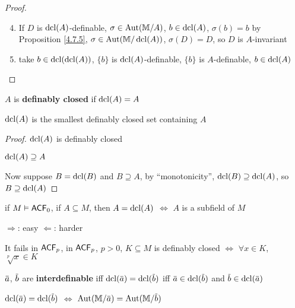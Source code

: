 \documentclass[11pt]{article}
\begin{document}
\begin{proof}
\begin{enumerate}
\setcounter{enumi}{3}
\item If \(D\) is \(\operatorname{dcl}(A)\)-definable, \(\sigma\in\operatorname{\text{Aut}}(\mathbb{M}/A)\),  \(b\in\operatorname{dcl}(A)\), \(\sigma(b)=b\) by
Proposition \ref{4.7.5}, \(\sigma\in\operatorname{\text{Aut}}(\mathbb{M}/\operatorname{dcl}(A))\), \(\sigma(D)=D\), so \(D\) is \(A\)-invariant
\setcounter{enumi}{2}
\item take \(b\in\operatorname{dcl}(\operatorname{dcl}(A))\), \(\{b\}\) is \(\operatorname{dcl}(A)\)-definable, \(\{b\}\) is \(A\)-definable, \(b\in\operatorname{dcl}(A)\)
\end{enumerate}
\end{proof}

\begin{definition}[]
\(A\) is \textbf{definably closed} if \(\operatorname{dcl}(A)=A\)
\end{definition}

\begin{proposition}[]
\(\operatorname{dcl}(A)\) is the smallest definably closed set containing \(A\)
\end{proposition}

\begin{proof}
\(\operatorname{dcl}(A)\) is definably closed

\(\operatorname{dcl}(A)\supseteq A\)

Now suppose \(B=\operatorname{dcl}(B)\) and \(B\supseteq A\), by ``monotonicity'', \(\operatorname{dcl}(B)\supseteq\operatorname{dcl}(A)\), so \(B\supseteq\operatorname{dcl}(A)\)
\end{proof}

\begin{fact}[]
if \(M\vDash\textsf{ACF}_0\), if \(A\subseteq M\), then \(A=\operatorname{dcl}(A)\) \(\Leftrightarrow\) \(A\) is a subfield of \(M\)

\(\Rightarrow\): easy
\(\Leftarrow\): harder

It fails in \(\textsf{ACF}_p\), in \(\textsf{ACF}_p\), \(p>0\), \(K\subseteq M\) is definably
closed \(\Leftrightarrow\) \(\forall x\in K\), \(\sqrt[p]{x}\in K\)
\end{fact}

\begin{definition}[]
\(\bara\), \(\barb\) are \textbf{interdefinable} iff \(\dcl(\bara)=\dcl(\barb)\) iff \(\bara\in\dcl(\barb)\)
and \(\barb\in\dcl(\bara)\)
\end{definition}

\begin{lemma}[]
\label{4.7.11}
\(\dcl(\bara)=\dcl(\barb)\) \(\Leftrightarrow\)  \(\Aut(\M/\bara)=\Aut(\M/\barb)\)
\end{lemma}
\end{document}
